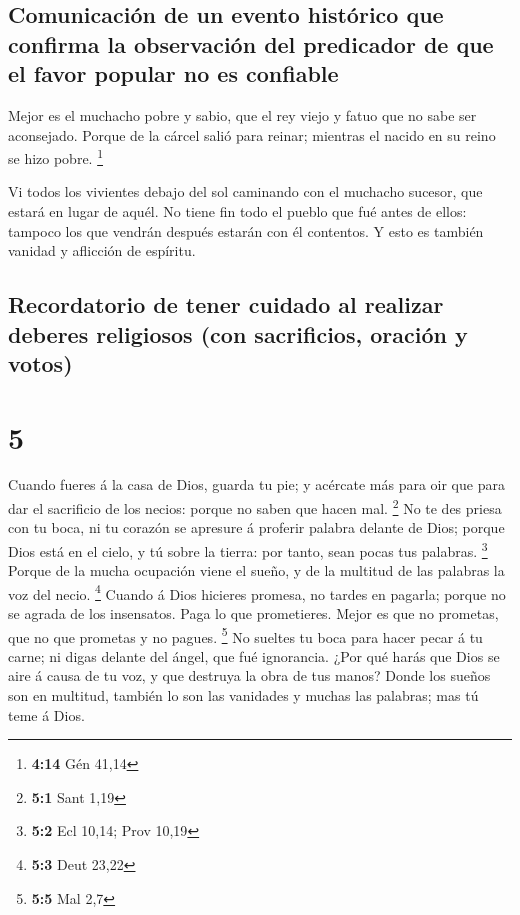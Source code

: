 \hypertarget{comunicaciuxf3n-de-un-evento-histuxf3rico-que-confirma-la-observaciuxf3n-del-predicador-de-que-el-favor-popular-no-es-confiable}{%
\subsection{Comunicación de un evento histórico que confirma la
observación del predicador de que el favor popular no es
confiable}\label{comunicaciuxf3n-de-un-evento-histuxf3rico-que-confirma-la-observaciuxf3n-del-predicador-de-que-el-favor-popular-no-es-confiable}}

 Mejor es el muchacho pobre y sabio, que el rey viejo y
fatuo que no sabe ser aconsejado.  Porque de la cárcel
salió para reinar; mientras el nacido en su reino se hizo pobre.
\footnote{\textbf{4:14} Gén 41,14}

 Vi todos los vivientes debajo del sol caminando con el
muchacho sucesor, que estará en lugar de aquél.  No tiene
fin todo el pueblo que fué antes de ellos: tampoco los que vendrán
después estarán con él contentos. Y esto es también vanidad y aflicción
de espíritu.

\hypertarget{recordatorio-de-tener-cuidado-al-realizar-deberes-religiosos-con-sacrificios-oraciuxf3n-y-votos}{%
\subsection{Recordatorio de tener cuidado al realizar deberes religiosos
(con sacrificios, oración y
votos)}\label{recordatorio-de-tener-cuidado-al-realizar-deberes-religiosos-con-sacrificios-oraciuxf3n-y-votos}}

\hypertarget{section-4}{%
\section{5}\label{section-4}}

 Cuando fueres á la casa de Dios, guarda tu pie; y acércate
más para oir que para dar el sacrificio de los necios: porque no saben
que hacen mal. \footnote{\textbf{5:1} Sant 1,19}  No te des
priesa con tu boca, ni tu corazón se apresure á proferir palabra delante
de Dios; porque Dios está en el cielo, y tú sobre la tierra: por tanto,
sean pocas tus palabras. \footnote{\textbf{5:2} Ecl 10,14; Prov 10,19}
 Porque de la mucha ocupación viene el sueño, y de la
multitud de las palabras la voz del necio. \footnote{\textbf{5:3} Deut
  23,22}  Cuando á Dios hicieres promesa, no tardes en
pagarla; porque no se agrada de los insensatos. Paga lo que prometieres.
 Mejor es que no prometas, que no que prometas y no pagues.
\footnote{\textbf{5:5} Mal 2,7}  No sueltes tu boca para
hacer pecar á tu carne; ni digas delante del ángel, que fué ignorancia.
¿Por qué harás que Dios se aire á causa de tu voz, y que destruya la
obra de tus manos?  Donde los sueños son en multitud,
también lo son las vanidades y muchas las palabras; mas tú teme á Dios.

